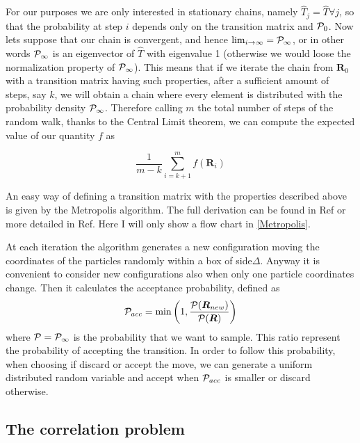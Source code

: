 For our purposes we are only interested in stationary chains, namely $\hat{T}_j=\hat{T}\forall j$, so that the probability at step $i$ depends only on the transition matrix and $\mathcal{P}_0$.
Now lets suppose that our chain is convergent, and hence $\lim_{i\to\infty}=\mathcal{P}_{\infty}$, or in other words $\mathcal{P}_{\infty}$ is an eigenvector of $\hat{T}$ with eigenvalue 1 (otherwise we would loose the normalization property of $\mathcal{P}_{\infty}$).
This means that if we iterate the chain from $\bm{R}_0$ with a transition matrix having such properties, after a sufficient amount of steps, say $k$, we will obtain a chain where every element is distributed with the probability density $\mathcal{P}_{\infty}$.
Therefore calling $m$ the total number of steps of the random walk, thanks to the Central Limit theorem, we can compute the expected value of our quantity $f$ as

\begin{equation}
  \dfrac{1}{m-k}\sum_{i=k+1}^m f(\bm{R}_i)
\end{equation}

An easy way of defining a transition matrix with the properties described above is given by the Metropolis algorithm. The full derivation can be found in Ref\cite{Pederiva2017} or more detailed in Ref\cite{MonteCarloMethods}.
Here I will only show a flow chart in \autoref{Metropolis}.

At each iteration the algorithm generates a new configuration moving the coordinates of the particles randomly within a box of side$\Delta$.
Anyway it is convenient to consider new configurations also when only one particle coordinates change.
Then it calculates the acceptance probability, defined as
\begin{equation}
  \mathcal{P}_{acc}=\min\left(1,\dfrac{\mathcal{P}(\bm{R}_{new})}{\mathcal{P}(\bm{R})}\right)
  \label{Pacc}
\end{equation}
where $\mathcal{P}=\mathcal{P}_{\infty}$ is the probability that we want to sample.
This ratio represent the probability of accepting the transition.
In order to follow this probability, when choosing if discard or accept the move, we can generate a uniform distributed random variable and accept when $\mathcal{P}_{acc}$ is smaller or discard otherwise.

\subsection{The correlation problem}
\label{correlation}

